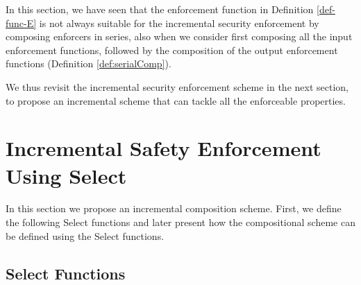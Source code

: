 {%

In this section, we have seen that the enforcement function in Definition \ref{def-func-E}  is not always suitable for the incremental security enforcement by composing enforcers in series, also when we consider first composing all the input enforcement functions, followed by the composition of the output enforcement functions (Definition \ref{def:serialComp}).



We thus revisit the incremental security enforcement scheme in the next section, to propose an incremental scheme that can tackle all the enforceable properties.

}
\section{Incremental Safety Enforcement Using Select}
\label{sec:new:def}
In this section we propose an incremental composition scheme. First, we define the following Select functions and later present how the compositional scheme can be defined using the Select functions. 

%
\subsection{Select Functions}
\label{sec:new:edit}

%

